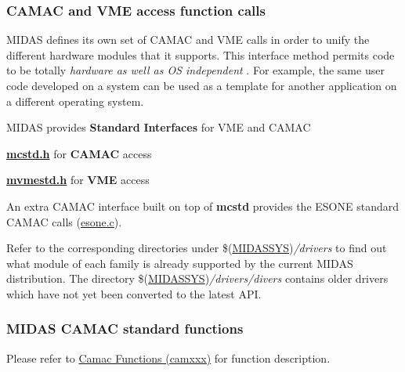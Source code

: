 \par
 \par


 \par
 \label{index_end}
\hypertarget{index_end}{}
 \subsubsection{CAMAC and VME access function calls}\label{FE_camac_vme_function_calls}
\par
 

\par
 \label{FE_camac_vme_function_calls_idx_hardware_standard_interface}
\hypertarget{FE_camac_vme_function_calls_idx_hardware_standard_interface}{}
 MIDAS defines its own set of CAMAC and VME calls in order to unify the different hardware modules that it supports. This interface method permits code to be totally {\itshape  hardware as well as OS independent \/}. For example, the same user code developed on a system can be used as a template for another application on a different operating system.

MIDAS provides {\bfseries Standard} {\bfseries Interfaces} for VME and CAMAC
\begin{DoxyItemize}
\item {\bfseries \hyperlink{mcstd_8h}{mcstd.h}} for {\bfseries CAMAC} access
\item {\bfseries \hyperlink{mvmestd_8h}{mvmestd.h}} for {\bfseries VME} access
\end{DoxyItemize}

An extra CAMAC interface built on top of {\bfseries mcstd} provides the ESONE standard CAMAC calls (\hyperlink{esone_8c}{esone.c}).

Refer to the corresponding directories under \$(\hyperlink{BuildingOptions_BO_MIDASSYS}{MIDASSYS}){\itshape /drivers\/} to find out what module of each family is already supported by the current MIDAS distribution. The directory \$(\hyperlink{BuildingOptions_BO_MIDASSYS}{MIDASSYS}){\itshape /drivers/divers\/} contains older drivers which have not yet been converted to the latest API.

\label{FE_camac_vme_function_calls_idx_hardware_standard_interface_CAMAC}
\hypertarget{FE_camac_vme_function_calls_idx_hardware_standard_interface_CAMAC}{}
 

 \hypertarget{FE_camac_vme_function_calls_FE_Midas_CAMAC_standard_functions}{}\subsubsection{MIDAS CAMAC standard functions}\label{FE_camac_vme_function_calls_FE_Midas_CAMAC_standard_functions}
Please refer to \hyperlink{group__mcstdfunctionh}{Camac Functions (camxxx)} for function description.


